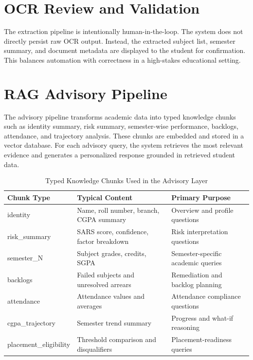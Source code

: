 \section{OCR Review and Validation}
The extraction pipeline is intentionally human-in-the-loop. The system does not directly persist raw OCR output. Instead, the extracted subject list, semester summary, and document metadata are displayed to the student for confirmation. This balances automation with correctness in a high-stakes educational setting.

\section{RAG Advisory Pipeline}
The advisory pipeline transforms academic data into typed knowledge chunks such as identity summary, risk summary, semester-wise performance, backlogs, attendance, and trajectory analysis. These chunks are embedded and stored in a vector database. For each advisory query, the system retrieves the most relevant evidence and generates a personalized response grounded in retrieved student data.

\begin{table}[H]
\centering
\caption{Typed Knowledge Chunks Used in the Advisory Layer}
\begin{tabularx}{\textwidth}{>{\raggedright\arraybackslash}p{} >{\raggedright\arraybackslash}p{} >{\raggedright\arraybackslash}X}
\toprule
\textbf{Chunk Type} & \textbf{Typical Content} & \textbf{Primary Purpose} \\
\midrule
identity & Name, roll number, branch, CGPA summary & Overview and profile questions \\
risk\_summary & SARS score, confidence, factor breakdown & Risk interpretation questions \\
semester\_N & Subject grades, credits, SGPA & Semester-specific academic queries \\
backlogs & Failed subjects and unresolved arrears & Remediation and backlog planning \\
attendance & Attendance values and averages & Attendance compliance questions \\
cgpa\_trajectory & Semester trend summary & Progress and what-if reasoning \\
placement\_eligibility & Threshold comparison and disqualifiers & Placement-readiness queries \\
\bottomrule
\end{tabularx}
\end{table}

